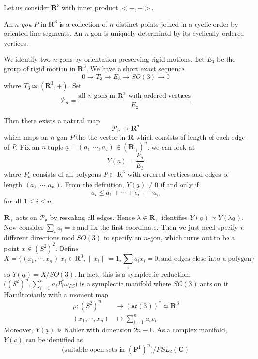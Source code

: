 \documentclass[
11pt, %
letterpaper， %
oneside, %
headinclude,footinclude, %
BCOR5mm, %
]{scrartcl}
\newcommand{\R}{{\mathbf{R}}}
\newcommand{\C}{{\mathbf{C}}}
\newcommand{\cp}{{\mathbf{P}}}
\begin{document}
\begin{ex}
	Let us consider $\R^3$ with inner product $<-,->$.
	\begin{definition}
		An $n$-{\itshape gon}  $P$ in $\R^3$ is a collection of $n$ distinct points joined in a cyclic order by oriented line segments. An $n$-gon is uniquely determined by its cyclically ordered vertices.
	\end{definition}
We identify two $n$-gons by orientation preserving rigid motions. Let $E_3$ be the group of rigid motion in $\R^3$. We have a short exact sequence
\begin{equation*}
0\to T_3\to E_3\to SO(3)\to 0
\end{equation*}
where $T_3\simeq (\R^3, +)$. Set
\begin{equation*}
\mathcal{P}_n=\frac{\text{all $n$-gons in $\R^3$ with ordered vertices}}{E_3}
\end{equation*}

Then there exists a natural map 
\begin{equation*}
\mathcal{P}_n\to \R^n
\end{equation*}
which maps an $n$-gon $P$ the the vector in $\R$ which consists of length of each edge of $P$. Fix an $n$-tuple $\underline{a}=(a_1,\cdots, a_n)\in (\R_+)^n$, we can look at $$Y(\underline{a})=\frac{P_{\underline{a}}}{E_3}$$ where $P_{\underline{a}}$ consists of all polygons $P\subset \R^3$ with ordered vertices and edges of length $(a_1, \cdots, a_n)$. From the definition, $Y(\underline{a})\not=0$ if and only if 
\begin{equation*}
a_i\le a_1+\cdots+ \hat{a_i}+\cdots a_n
\end{equation*}
for all $1\le i\le n$.
\begin{rem}
	$\R_+$ acts on $\mathcal{P}_n$ by rescaling all edges. Hence $\lambda \in \R_+$ identifies $Y(\underline{a})\simeq Y(\lambda \underline{a})$. Now consider $\sum_i a_i=z$ and fix the first coordinate. Then we just need specify $n$ different directions mod $SO(3)$ to specify an $n$-gon, which turns out to be a point $x\in(S^2)^2$. Define 
	\begin{equation*}
	X=\{ (x_1,\cdots, x_n)| x_i\in \R^3, \|x_i\|=1, \sum_i a_ix_i=0, \text{and edges close into a polygon} \}
	\end{equation*}
	so $Y(\underline{a})=X/SO(3)$. In fact, this is a symplectic reduction. $\big( (S^2)^{ n}, \sum_{i=1}^n a_i P_i^* \omega_{FS}\big)$ is a symplectic manifold where $SO(3)$ acts on it Hamiltonianly with a moment map
	\begin{align*}
	\mu: (S^2)^n &\to (\mathfrak{so}(3))^*\simeq \R^3\\
	(x_1,\cdots, x_n) &\mapsto \sum_{i=1}^n a_ix_i 
	\end{align*}
	Moreover, $Y(\underline{a})$ is Kahler with dimension $2n-6$. As a complex manifold,  $Y(\underline{a})$ can be identified as \begin{equation*}
	\big(\text{suitable open sets in $(\cp^1)^n$}\big)/PSL_2(\C)
	\end{equation*}
\end{rem}
\end{ex}
\end{document}
